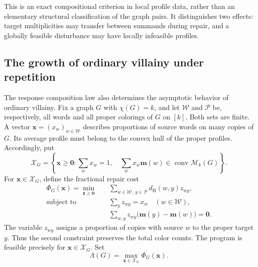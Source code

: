 \documentclass[11pt,reqno]{amsart}
\numberwithin{equation}{section}
\theoremstyle{definition}
\theoremstyle{remark}
\begin{document}
This is an exact compositional criterion in local profile data, rather
than an elementary structural classification of the graph pairs.
It distinguishes two effects: target multiplicities may transfer
between summands during repair, and a globally feasible disturbance
may have locally infeasible profiles.

\subsection{The growth of ordinary villainy under repetition}
\label{union:ordinary-repetition-section}

The response composition law also determines the asymptotic behavior
of ordinary villainy. Fix a graph $G$ with $\chi(G)=k$, and let
$\mathcal W$ and $\mathcal P$ be, respectively, all words and all
proper colorings of $G$ on $[k]$. Both sets are finite. A vector
$\mathbf x=(x_w)_{w\in\mathcal W}$ describes proportions of source
words on many copies of $G$. Its average profile must belong to the
convex hull of the proper profiles. Accordingly, put
\[
 \mathcal X_G=\left\{\mathbf x\ge\mathbf0:
   \sum_wx_w=1,\quad
   \sum_wx_w\mathbf m(w)\in\operatorname{conv}\mathcal M_k(G)
                 \right\}.
\]
For $\mathbf x\in\mathcal X_G$, define the fractional repair cost
\begin{equation}\label{union:fractional-response}
\begin{aligned}
 \Phi_G(\mathbf x)=\min_{\mathbf z\ge\mathbf0}\quad&
   \sum_{w\in\mathcal W,\ y\in\mathcal P}d_{\mathrm H}(w,y)z_{wy},\\
 \text{subject to}\quad&\sum_yz_{wy}=x_w\quad(w\in\mathcal W),\\
 &\sum_{w,y}z_{wy}\bigl(\mathbf m(y)-\mathbf m(w)\bigr)=\mathbf0.
\end{aligned}
\end{equation}
The variable $z_{wy}$ assigns a proportion of copies with source $w$
to the proper target $y$. Thus the second constraint preserves the
total color counts. The program is feasible precisely for
$\mathbf x\in\mathcal X_G$. Set
\begin{equation}\label{union:ordinary-slope}
 \Lambda(G)=\max_{\mathbf x\in\mathcal X_G}\Phi_G(\mathbf x).
\end{equation}
\end{document}
